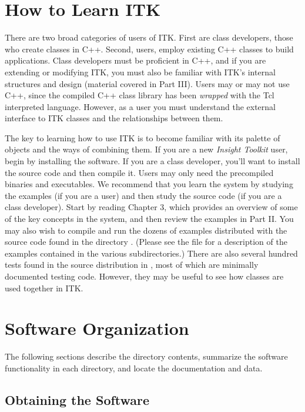 \section{How to Learn ITK}
\label{sec:HowToLearnITK}

There are two broad categories of users of ITK. First are class developers,
those who create classes in C++. Second, users, employ existing C++ classes
to build applications. Class developers must be proficient in C++, and if you
are extending or modifying ITK, you must also be familiar with ITK's internal
structures and design (material covered in Part III). Users may or may not
use C++, since the compiled C++ class library has been \emph{wrapped} with
the Tcl interpreted language. However, as a user you must understand the
external interface to ITK classes and the relationships between them.

The key to learning how to use ITK is to become familiar with its palette of
objects and the ways of combining them. If you are a new \emph{Insight
Toolkit} user, begin by installing the software. If you are a class
developer, you'll want to install the source code and then compile it. Users
may only need the precompiled binaries and executables. We recommend that you
learn the system by studying the examples (if you are a user) and then study
the source code (if you are a class developer). Start by reading Chapter 3,
which provides an overview of some of the key concepts in the system, and
then review the examples in Part II. You may also wish to compile and run the
dozens of examples distributed with the source code found in the directory
. (Please see the file 
 for
a description of the examples contained in the various subdirectories.) There
are also several hundred tests found in the source distribution in 
, most of which are minimally documented
testing code. However, they may be useful to see how classes are used
together in ITK.

\section{Software Organization}
\label{sec:SoftwareOrganization}

The following sections describe the directory contents, summarize the
software functionality in each directory, and locate the documentation and
data.

\subsection{Obtaining the Software}
\label{sec:ObtainingTheSoftware}

